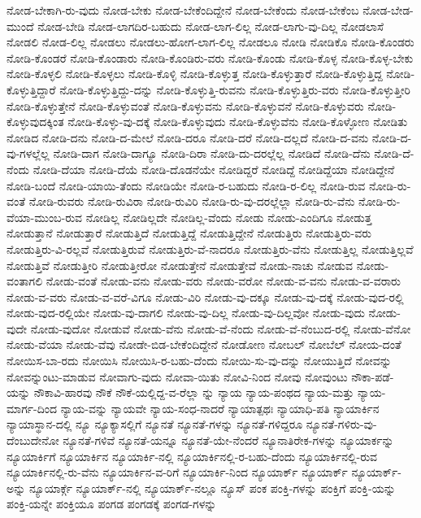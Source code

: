 {ನೋಡ-ಬೇಕಾಗಿ-ರು-ವುದು
ನೋಡ-ಬೇಕು
ನೋಡ-ಬೇಕೆಂದಿದ್ದೇನೆ
ನೋಡ-ಬೇಕೆಂದು
ನೋಡ-ಬೇಕೆಂಬ
ನೋಡ-ಬೇಡ-ಮುಂದೆ
ನೋಡ-ಬೇಡಿ
ನೋಡ-ಲಾಗದಿರ-ಬಹುದು
ನೋಡ-ಲಾಗ-ಲಿಲ್ಲ
ನೋಡ-ಲಾಗು-ವು-ದಿಲ್ಲ
ನೋಡಲಾಸೆ
ನೋಡಲಿ
ನೋಡ-ಲಿಲ್ಲ
ನೋಡಲು
ನೋಡಲು-ಹೋಗ-ಲಾಗ-ಲಿಲ್ಲ
ನೋಡಲೂ
ನೋಡಿ
ನೋಡಿಕೊ
ನೋಡಿ-ಕೊಂಡರು
ನೋಡಿ-ಕೊಂಡರೆ
ನೋಡಿ-ಕೊಂಡಾರು
ನೋಡಿ-ಕೊಂಡಿರು-ವರು
ನೋಡಿ-ಕೊಂಡು
ನೋಡಿ-ಕೊಳ್ಳ
ನೋಡಿ-ಕೊಳ್ಳ-ಬೇಕು
ನೋಡಿ-ಕೊಳ್ಳಲಿ
ನೋಡಿ-ಕೊಳ್ಳಲು
ನೋಡಿ-ಕೊಳ್ಳಿ
ನೋಡಿ-ಕೊಳ್ಳುತ್ತ
ನೋಡಿ-ಕೊಳ್ಳುತ್ತಾರೆ
ನೋಡಿ-ಕೊಳ್ಳುತ್ತಿದ್ದ
ನೋಡಿ-ಕೊಳ್ಳುತ್ತಿದ್ದಾರೆ
ನೋಡಿ-ಕೊಳ್ಳುತ್ತಿದ್ದು-ದನ್ನು
ನೋಡಿ-ಕೊಳ್ಳುತ್ತಿ-ರುವನು
ನೋಡಿ-ಕೊಳ್ಳುತ್ತಿರು-ವರು
ನೋಡಿ-ಕೊಳ್ಳುತ್ತೀರಿ
ನೋಡಿ-ಕೊಳ್ಳುತ್ತೇನೆ
ನೋಡಿ-ಕೊಳ್ಳುವಂತೆ
ನೋಡಿ-ಕೊಳ್ಳುವನು
ನೋಡಿ-ಕೊಳ್ಳುವನೆ
ನೋಡಿ-ಕೊಳ್ಳುವರು
ನೋಡಿ-ಕೊಳ್ಳುವುದಕ್ಕಿಂತ
ನೋಡಿ-ಕೊಳ್ಳು-ವು-ದಕ್ಕೆ
ನೋಡಿ-ಕೊಳ್ಳುವುದು
ನೋಡಿ-ಕೊಳ್ಳುವೆನು
ನೋಡಿ-ಕೊಳ್ಳೋಣ
ನೋಡಿತು
ನೋಡಿದ
ನೋಡಿ-ದನು
ನೋಡಿ-ದ-ಮೇಲೆ
ನೋಡಿ-ದರೂ
ನೋಡಿ-ದರೆ
ನೋಡಿ-ದಲ್ಲದೆ
ನೋಡಿ-ದ-ವನು
ನೋಡಿ-ದ-ವು-ಗಳಲ್ಲೆಲ್ಲ
ನೋಡಿ-ದಾಗ
ನೋಡಿ-ದಾಗ್ಯೂ
ನೋಡಿ-ದಿರಾ
ನೋಡಿ-ದು-ದರಲ್ಲೆಲ್ಲ
ನೋಡಿದೆ
ನೋಡಿ-ದೆನು
ನೋಡಿ-ದೆ-ನೆಂದು
ನೋಡಿ-ದೆಯಾ
ನೋಡಿ-ದೆಯೆ
ನೋಡಿ-ದೊಡನೆಯೇ
ನೋಡಿದ್ದರೆ
ನೋಡಿದ್ದೆ
ನೋಡಿದ್ದೆಯಾ
ನೋಡಿದ್ದೇನೆ
ನೋಡಿ-ಬಂದೆ
ನೋಡಿ-ಯಾಯಿ-ತೆಂದು
ನೋಡಿಯೇ
ನೋಡಿ-ರ-ಬಹುದು
ನೋಡಿ-ರ-ಲಿಲ್ಲ
ನೋಡಿ-ರುವ
ನೋಡಿ-ರು-ವಂತೆ
ನೋಡಿ-ರುವರು
ನೋಡಿ-ರುವಿರಾ
ನೋಡಿ-ರುವಿರಿ
ನೋಡಿ-ರು-ವು-ದರಲ್ಲೆಲ್ಲಾ
ನೋಡಿ-ರು-ವೆನು
ನೋಡಿ-ರು-ವೆಯಾ-ಮುಂಬ-ರುವ
ನೋಡಿಲ್ಲ
ನೋಡಿಲ್ಲದೇ
ನೋಡಿಲ್ಲ-ವೆಂದು
ನೋಡು
ನೋಡು-ಎಂದಿಗೂ
ನೋಡುತ್ತ
ನೋಡುತ್ತಾನೆ
ನೋಡುತ್ತಾರೆ
ನೋಡುತ್ತಿದೆ
ನೋಡುತ್ತಿದ್ದೆ
ನೋಡುತ್ತಿದ್ದೇನೆ
ನೋಡುತ್ತಿರು
ನೋಡುತ್ತಿರು-ವರು
ನೋಡುತ್ತಿರು-ವಿ-ರಲ್ಲವೆ
ನೋಡುತ್ತಿರುವೆ
ನೋಡುತ್ತಿರು-ವೆ-ನಾದರೂ
ನೋಡುತ್ತಿರು-ವೆನು
ನೋಡುತ್ತಿಲ್ಲ
ನೋಡುತ್ತಿಲ್ಲವೆ
ನೋಡುತ್ತಿವೆ
ನೋಡುತ್ತೀರಿ
ನೋಡುತ್ತೀರೋ
ನೋಡುತ್ತೇನೆ
ನೋಡುತ್ತೇವೆ
ನೋಡು-ನಾಚು
ನೋಡುವ
ನೋಡು-ವಂತಾಗಲಿ
ನೋಡು-ವಂತೆ
ನೋಡು-ವನು
ನೋಡು-ವರು
ನೋಡು-ವರೋ
ನೋಡು-ವ-ವನು
ನೋಡು-ವ-ವರಾರು
ನೋಡು-ವ-ವರು
ನೋಡು-ವ-ವರೆ-ವಿಗೂ
ನೋಡು-ವಿರಿ
ನೋಡು-ವು-ದಕ್ಕೂ
ನೋಡು-ವು-ದಕ್ಕೆ
ನೋಡು-ವುದ-ರಲ್ಲಿ
ನೋಡು-ವುದ-ರಲ್ಲಿಯೇ
ನೋಡು-ವು-ದಾಗಲಿ
ನೋಡು-ವು-ದಿಲ್ಲ
ನೋಡು-ವು-ದಿಲ್ಲವೋ
ನೋಡು-ವುದು
ನೋಡು-ವುದೇ
ನೋಡು-ವುದೋ
ನೋಡುವೆ
ನೋಡು-ವೆನು
ನೋಡು-ವೆ-ನೆಂದು
ನೋಡು-ವೆ-ನೆಂಬುದ-ರಲ್ಲಿ
ನೋಡು-ವೆನೋ
ನೋಡು-ವೆಯಾ
ನೋಡು-ವೆವು
ನೋಡೇ-ಬಿಡ-ಬೇಕೆಂದಿದ್ದೇನೆ
ನೋಡೋಣ
ನೋಬಲ್
ನೋಬೆಲ್
ನೋಯ-ದಂತೆ
ನೋಯಿಸ-ಬಾ-ರದು
ನೋಯಿಸಿ
ನೋಯಿಸಿ-ರ-ಬಹು-ದೆಂದು
ನೋಯಿ-ಸು-ವು-ದನ್ನು
ನೋಯುತ್ತಿದೆ
ನೋವನ್ನು
ನೋವನ್ನುಂಟು-ಮಾಡುವ
ನೋವಾಗು-ವುದು
ನೋವಾ-ಯಿತು
ನೋವಿ-ನಿಂದ
ನೋವು
ನೋವುಂಟು
ನೌಕಾ-ಪಡೆ-ಯನ್ನು
ನೌಕಾವಿ-ಹಾರವು
ನೌಕೆ
ನೌಕೆ-ಯಲ್ಲಿದ್ದ-ವ-ರೆಲ್ಲಾ
ನ್ನು
ನ್ಯಾಯ
ನ್ಯಾಯ-ಪಂಥದ
ನ್ಯಾಯ-ಮತ್ತು
ನ್ಯಾಯ-ಮಾರ್ಗ-ದಿಂದ
ನ್ಯಾಯ-ವನ್ನು
ನ್ಯಾಯವೇ
ನ್ಯಾಯ-ಸಂಧ-ನಾದರೆ
ನ್ಯಾಯಾತ್ಪಥಃ
ನ್ಯಾಯಾಧಿ-ಪತಿ
ನ್ಯಾಯಾರ್ಕಿನ
ನ್ಯಾಯಾಸ್ಥಾನ-ದಲ್ಲಿ
ನ್ಯೂ
ನ್ಯೂಕ್ಯಾಸಲ್ಲಿಗೆ
ನ್ಯೂನತೆ
ನ್ಯೂನತೆ-ಗಳನ್ನು
ನ್ಯೂನತೆ-ಗಳಿದ್ದರೂ
ನ್ಯೂನತೆ-ಗಳಿರು-ವು-ದೆಂಬುದೇನೋ
ನ್ಯೂನತೆ-ಗಳಿವೆ
ನ್ಯೂನತೆ-ಯನ್ನೂ
ನ್ಯೂನತೆ-ಯೇ-ನೆಂದರೆ
ನ್ಯೂನಾತಿರೇಕ-ಗಳನ್ನು
ನ್ಯೂಯಾರ್ಕನ್ನು
ನ್ಯೂಯಾರ್ಕಿಗೆ
ನ್ಯೂಯಾರ್ಕಿನ
ನ್ಯೂಯಾರ್ಕಿ-ನಲ್ಲಿ
ನ್ಯೂಯಾರ್ಕಿನಲ್ಲಿ-ರ-ಬಹು-ದೆಂದು
ನ್ಯೂಯಾರ್ಕಿನಲ್ಲಿ-ರುವ
ನ್ಯೂಯಾರ್ಕಿನಲ್ಲಿ-ರು-ವೆನು
ನ್ಯೂಯಾರ್ಕಿನ-ವ-ರಿಗೆ
ನ್ಯೂಯಾರ್ಕಿ-ನಿಂದ
ನ್ಯೂಯಾರ್ಕ್
ನ್ಯೂಯಾರ್ಕ್
ನ್ಯೂಯಾರ್ಕ್-ಅನ್ನು
ನ್ಯೂಯಾರ್ಕ್ಗೆ
ನ್ಯೂಯಾರ್ಕ್-ನಲ್ಲಿ
ನ್ಯೂಯಾರ್ಕ್-ನಲ್ಲೂ
ನ್ಯೂಸ್
ಪಂಕ
ಪಂಕ್ತಿ-ಗಳನ್ನು
ಪಂಕ್ತಿಗೆ
ಪಂಕ್ತಿ-ಯನ್ನು
ಪಂಕ್ತಿ-ಯನ್ನೇ
ಪಂಕ್ತಿಯೂ
ಪಂಗಡ
ಪಂಗಡಕ್ಕೆ
ಪಂಗಡ-ಗಳನ್ನು
}
